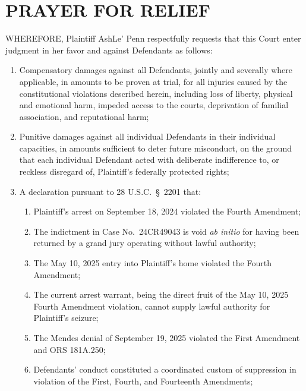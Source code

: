 \documentclass[12pt,letterpaper]{article}
\newcommand{\sect}{§}
\begin{document}
	\section*{PRAYER FOR RELIEF}
	WHEREFORE, Plaintiff AshLe' Penn respectfully requests that
	this Court enter judgment in her favor and against Defendants
	as follows:
	\begin{enumerate}[label=\Alph*.,leftmargin=0.5in,itemsep=4pt]
		
		\item Compensatory damages against all Defendants, jointly
		and severally where applicable, in amounts to be proven at
		trial, for all injuries caused by the constitutional
		violations described herein, including loss of liberty,
		physical and emotional harm, impeded access to the courts,
		deprivation of familial association, and reputational harm;
		
		\item Punitive damages against all individual Defendants in
		their individual capacities, in amounts sufficient to deter
		future misconduct, on the ground that each individual
		Defendant acted with deliberate indifference to, or reckless
		disregard of, Plaintiff's federally protected rights;
		
		\item A declaration pursuant to 28 U.S.C.\ \sect\ 2201 that:
		\begin{enumerate}[label=(\roman*),leftmargin=0.5in,
			itemsep=2pt]
			\item Plaintiff's arrest on September 18, 2024 violated the
			Fourth Amendment;
			\item The indictment in Case No.\ 24CR49043 is void
			\textit{ab initio} for having been returned by a grand jury
			operating without lawful authority;
			\item The May 10, 2025 entry into Plaintiff's home violated
			the Fourth Amendment;
			\item The current arrest warrant, being the direct fruit of
			the May 10, 2025 Fourth Amendment violation, cannot supply
			lawful authority for Plaintiff's seizure;
			\item The Mendes denial of September 19, 2025 violated the
			First Amendment and ORS 181A.250;
			\item Defendants' conduct constituted a coordinated custom
			of suppression in violation of the First, Fourth, and
			Fourteenth Amendments;
		\end{enumerate}
		

\end{enumerate}
\end{document}
